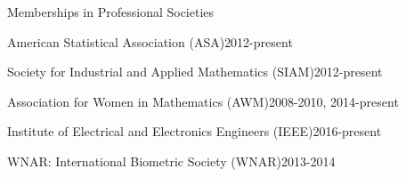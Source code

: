 \documentclass{resume} %
\begin{document}
\begin{rSection}{Memberships in Professional Societies}
\begin{esSubsection}{American Statistical Association }{(ASA)}{2012-present}{}{}
\end{esSubsection}

\begin{esSubsection}{Society for Industrial and Applied Mathematics }{(SIAM)}{2012-present}{}{}
\end{esSubsection}

\begin{esSubsection}{Association for Women in Mathematics }{(AWM)}{2008-2010, 2014-present}{}{}
\end{esSubsection}

\begin{esSubsection}{Institute of Electrical and Electronics Engineers }{(IEEE)}{2016-present}{}{}
\end{esSubsection}

\begin{esSubsection}{WNAR: International Biometric Society }{(WNAR)}{2013-2014}{}{}
\end{esSubsection}


\end{rSection}



\clearpage
\end{document}
